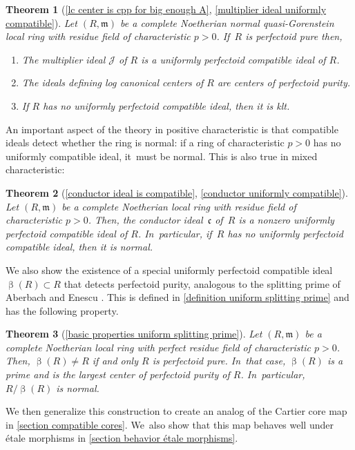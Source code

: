 \documentclass[JEP,XML,SOM,Unicode,published]{cedram}
\let\autoref\cref
\theoremstyle{plain}
\newtheorem{mainthm}{Theorem}
\theoremstyle{definition}
\numberwithin{equation}{theorem}
\newcommand{\fracc}{\mathfrak{c}}
\newcommand{\fram}{\mathfrak{m}}
\newcommand{\sJ}{\mathcal{J}}
\begin{document}
\begin{mainthm}[{\autoref{lc center is cpp for big enough A}, \autoref{multiplier ideal uniformly compatible}}]
Let $(R,\fram)$ be a complete Noetherian normal quasi-Gorenstein local ring with residue field of characteristic $p>0$. If~$R$ is perfectoid pure then,
\begin{enumerate}
\item The multiplier ideal $\sJ$ of $R$ is a uniformly perfectoid compatible ideal of $R$.
\item The ideals defining log canonical centers of $R$ are centers of perfectoid purity.
\item If $R$ has no uniformly perfectoid compatible ideal, then it is klt.
\end{enumerate}
\end{mainthm}

An important aspect of the theory in positive characteristic is that compatible ideals detect whether the ring is normal: if a ring of characteristic $p>0$ has no uniformly compatible ideal, it~must be normal. This is also true in mixed characteristic:

\begin{mainthm}[{\autoref{conductor ideal is compatible}, \autoref{conductor uniformly compatible}}]
Let $(R,\fram)$ be a complete Noetherian local ring with residue field of characteristic $p>0$. Then, the conductor ideal~$\fracc$ of~$R$ is a nonzero uniformly perfectoid compatible ideal of $R$. In~particular, if~$R$ has no uniformly perfectoid compatible ideal, then it is normal.
\end{mainthm}

We also show the existence of a special uniformly perfectoid compatible ideal $\upbeta(R)\subset R$ that detects perfectoid purity, analogous to the splitting prime of Aberbach and Enescu \cite{AberbachEnescuStructureOfFPure}. This is defined in \autoref{definition uniform splitting prime} and has the following property.

\begin{mainthm}[{\autoref{basic properties uniform splitting prime}}]
Let $(R,\fram)$ be a complete Noetherian local ring with perfect residue field of characteristic $p>0$. Then, $\upbeta(R)\neq R$ if and only $R$ is perfectoid pure. In~that case, $\upbeta(R)$ is a prime and is the largest center of perfectoid purity of $R$. In~particular, $R/\upbeta(R)$ is normal.
\end{mainthm}

We then generalize this construction to create an analog of the Cartier core map \cite{BadillaCespedesFInvariantsSRRings,BrosowskyCartierCoreMap,CarvajalFayolleTameRamificationCFPS} in \autoref{section compatible cores}. We~also show that this map behaves well under étale morphisms in \autoref{section behavior étale morphisms}.
\end{document}
